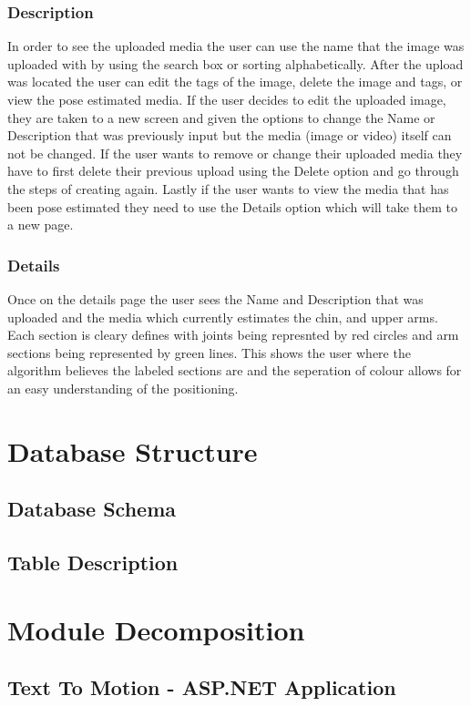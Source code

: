 \documentclass{scrreprt}
\begin{document}
\subsection{Description}
In order to see the uploaded media the user can use the name that the image was uploaded with by using the search box or sorting alphabetically. After the upload was located the user can edit the tags of the image, delete the image and tags, or view the pose estimated media. If the user decides to edit the uploaded image, they are taken to a new screen and given the options to change the Name or Description that was previously input but the media (image or video) itself can not be changed. If the user wants to remove or change their uploaded media they have to first delete their previous upload using the Delete option and go through the steps of creating again. Lastly if the user wants to view the media that has been pose estimated they need to use the Details option which will take them to a new page.

\subsection{Details}
Once on the details page the user sees the Name and Description that was uploaded and the media which currently estimates the chin, and upper arms. Each section is cleary defines with joints being represnted by red circles and arm sections being represented by green lines. This shows the user where the algorithm believes the labeled sections are and the seperation of colour allows for an easy understanding of the positioning.

\chapter{Database Structure}

\section{Database Schema}
\section{Table Description}

\chapter{Module Decomposition}

\section{Text To Motion - ASP.NET Application}
\end{document}
